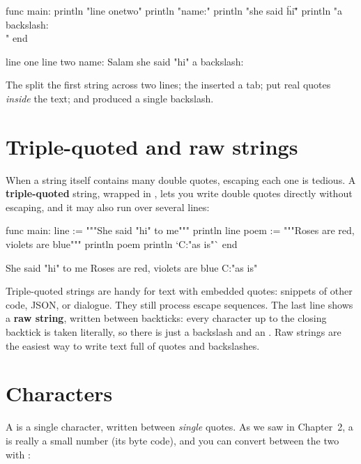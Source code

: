 \begin{salamen}
func main:
    println "line one\nline two"
    println "name:\tSalam"
    println "she said \"hi\""
    println "a backslash: \\"
end
\end{salamen}

\begin{progout}
line one
line two
name:	Salam
she said "hi"
a backslash: \
\end{progout}

The  split the first string across two lines; the
\code{\textbackslash t} inserted a tab; \code{\textbackslash"} put real quotes
\emph{inside} the text; and \code{\textbackslash\textbackslash} produced a single
backslash.

\section{Triple-quoted and raw strings}

When a string itself contains many double quotes, escaping each one is tedious. A
\textbf{triple-quoted} string, wrapped in \code{"""}, lets you write double
quotes directly without escaping, and it may also run over several lines:

\begin{salamen}
func main:
    line := """She said "hi" to me"""
    println line
    poem := """Roses are red,
violets are blue"""
    println poem
    println `C:\new\table "as is"`
end
\end{salamen}

\begin{progout}
She said "hi" to me
Roses are red,
violets are blue
C:\new\table "as is"
\end{progout}

Triple-quoted strings are handy for text with embedded quotes: snippets of
other code, JSON, or dialogue. They still process escape sequences. The last
line shows a \textbf{raw string}, written between backticks: every character up
to the closing backtick is taken literally, so \code{\textbackslash n} there is
just a backslash and an \code{n}. Raw strings are the easiest way to write text
full of quotes and backslashes.

\section{Characters}

A  is a single character, written between \emph{single} quotes. As we
saw in Chapter~2, a \code{char} is really a small number (its byte code), and you
can convert between the two with \code{as}:

